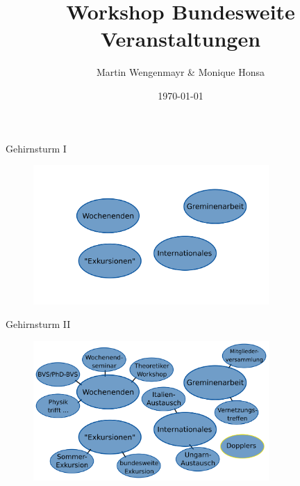 \documentclass[
]{beamer}
\title[Bundesweites]{Workshop Bundesweite Veranstaltungen}
\author[Martin \& Monique]{Martin Wengenmayr \& Monique Honsa}
\date{\today}
\begin{document}
\maketitle

\begin{frame}{Gehirnsturm I}
  \begin{figure}
   \centering
   \includegraphics[width=0.80\textwidth]{figure/brainstormBundesweit_empty}
  \end{figure}
\end{frame}

\begin{frame}{Gehirnsturm II}
  \begin{figure}
   \centering
   \includegraphics[width=0.80\textwidth]{figure/brainstormBundesweit_full}
  \end{figure}
\end{frame}
\end{document}
